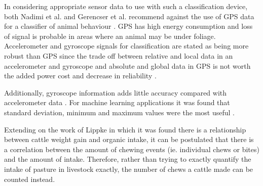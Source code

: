 In considering appropriate sensor data to use with such a classification device, both Nadimi et al. and Gerencser et al. recommend against the use of GPS data for a classifier of animal behaviour \cite{Nadimi2012} \cite{Gerencser2013}. GPS has high energy consumption and loss of signal is probable in areas where an animal may be under foliage. Accelerometer and gyroscope signals for classification are stated as being more robust than GPS since the trade off between relative and local data in an accelerometer and gyroscope and absolute and global data in GPS is not worth the added power cost and decrease in reliability \cite{Gerencser2013}.

Additionally, gyroscope information adds little accuracy compared with accelerometer data \cite{Gerencser2013}. For machine learning applications it was found that standard deviation, minimum and maximum values were the most useful \cite{Gerencser2013}. 

Extending on the work of Lippke \cite{Lippke1980} in which it was found there is a relationship between cattle weight gain and organic intake, it can be postulated that there is a correlation between the amount of chewing events (ie. individual chews or bites) and the amount of intake. Therefore, rather than trying to exactly quantify the intake of pasture in livestock exactly, the number of chews a cattle made can be counted instead.



